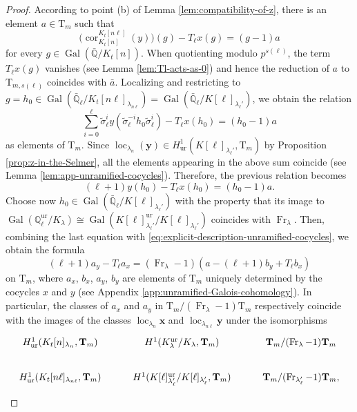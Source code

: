 \documentclass[12pt,reqno]{amsart}
\theoremstyle{definition}
\theoremstyle{remark}
\newcommand{\numberset}{\mathbb}
\newcommand{\Q}{\numberset{Q}}
\newcommand{\T}{\boldsymbol{\mathrm{T}}}
\DeclareMathOperator{\Gal}{Gal}
\DeclareMathOperator{\Cor}{cor}
\DeclareMathOperator{\loc}{loc}
\DeclareMathOperator{\Fr}{Fr}
\newcommand{\ur}{\mathrm{ur}}
\newcommand{\gl}{\lambda}
\newcommand{\gs}{\sigma}
\begin{document}
\begin{proof}
    According to point (b) of Lemma \ref{lem:compatibility-of-z}, there is an element $a\in\T_m$ such that
    \begin{equation*}
        \big(\Cor_{K_t[n]}^{K_t[n\ell]}(y)\big)(g)-T_\ell x(g)=(g-1)a
    \end{equation*}
    for every $g\in\Gal(\bar{\Q}/K_t[n])$. When quotienting modulo $p^{s(\ell)}$, the term $T_\ell x(g)$ vanishes (see Lemma \ref{lem:Tl-acts-as-0}) and hence the reduction of $a$ to $\T_{m,s(\ell)}$ coincides with $\bar{a}$. Localizing and restricting to $g=h_0\in \Gal(\bar{\Q}_\ell/K_t[n\ell]_{\gl_{n\ell}})=\Gal(\bar{\Q}_\ell/K[\ell]_{\gl_\ell'})$, we obtain the relation
    \begin{equation*}
        \sum_{i=0}^{\ell} \tilde{\gs}_\ell^i y(\tilde{\gs}_\ell^{-i} h_0\tilde{\gs}_\ell^i)-T_\ell x(h_0)=(h_0-1)a
    \end{equation*}
    as elements of $\T_m$. Since $\loc_{\gl_n}(\boldsymbol{y})\in H^1_{\ur}(K[\ell]_{\gl_\ell'},\T_m)$ by Proposition \ref{prop:z-in-the-Selmer}, all the elements appearing in the above sum coincide (see Lemma \ref{lem:app-unramified-cocycles}). Therefore, the previous relation becomes
    \begin{equation*}
        (\ell+1) y(h_0)-T_\ell x(h_0)=(h_0-1)a.
    \end{equation*}
    Choose now $h_0\in \Gal(\bar{\Q}_\ell/K[\ell]_{\gl_\ell'})$ with the property that its image to $\Gal(\Q_\ell^{\ur}/K_\gl)\cong \Gal(K[\ell]_{\gl_\ell'}^{\ur}/K[\ell]_{\gl_\ell'})$ coincides with $\Fr_\gl$. Then, combining the last equation with \eqref{eq:explicit-description-unramified-cocycles}, we obtain the formula
    \begin{equation*}
        (\ell+1)a_y-T_\ell a_x=(\Fr_\gl-1)(a-(\ell+1)b_y+T_\ell b_x)
    \end{equation*}
    on $\T_m$, where $a_x$, $b_x$, $a_y$, $b_y$ are elements of $\T_m$ uniquely determined by the cocycles $x$ and $y$ (see Appendix \ref{app:unramified-Galois-cohomology}). In particular, the classes of $a_x$ and $a_y$ in $\T_m/(\Fr_\gl-1)\T_m$ respectively coincide with the images of the classes $\loc_{\gl_{n}}\boldsymbol{x}$ and $\loc_{\gl_{n\ell}}\boldsymbol{y}$ under the isomorphisms
    \begin{equation}\label{eq:diagram-unramified-cohomology}
        \begin{tikzcd}
	{H^1_{\ur}(K_t[n]_{\gl_{n}},\T_m)} & {H^1(K_\gl^{\ur}/K_\gl,\T_m)} & {\T_m/(\Fr_\gl-1)\T_m} \\
	{H^1_{\ur}(K_t[n\ell]_{\gl_{n\ell}},\T_m)} & {H^1(K[\ell]_{\gl_{\ell}'}^{\ur}/K[\ell]_{\gl_{\ell}'},\T_m)} & {\T_m/(\Fr_{\gl_\ell'}-1)\T_m,}

\end{tikzcd}
\end{equation}
\end{proof}
\end{document}
